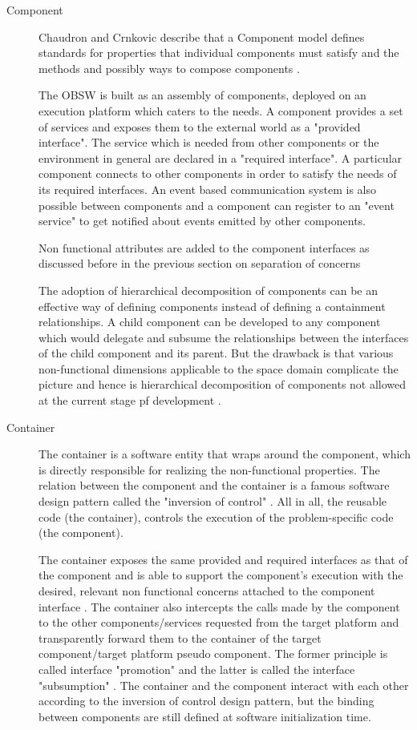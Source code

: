 \begin{description}
\item[Component] Chaudron and Crnkovic describe that a Component model defines standards for properties that individual components must satisfy and the methods and possibly ways to compose components \cite{CompBasedProcess}.

The OBSW is built as an assembly of components, deployed on an execution platform which caters to the needs. A component provides a set of services and exposes them to the external world as a "provided interface". The service which is needed from other components or the environment in general are declared in a "required interface". A particular component connects to other components in order to satisfy the needs of its required interfaces. An event based communication system is also possible between components and a component can register to an "event service" to get notified about events emitted by other components.

Non functional attributes are added to the component interfaces as discussed before in the previous section on separation of concerns

The adoption of hierarchical decomposition of components can be an effective way of defining components instead of defining a containment relationships. A child component can be developed to any component which would delegate and subsume the relationships between the interfaces of the child component and its parent. But the drawback is that various non-functional dimensions applicable to the space domain complicate the picture and hence is hierarchical decomposition of components not allowed at the current stage pf development \cite{PhdThesis}.
    
\item [Container] The container is a software entity that wraps around the component, which is directly responsible for realizing the non-functional properties. The relation between the component and the container is a famous software design pattern called the "inversion of control" \cite{CompBasedProcess} \cite{InvOfCntrlurl}. All in all, the reusable code (the container), controls the execution of the problem-specific code (the component).

The container exposes the same provided and required interfaces as that of the component and is able to support the component's execution with the desired, relevant non functional concerns attached to the component interface \cite{CompBasedDev}. The container also intercepts the calls made by the component to the other components/services requested from the target platform and transparently forward them to the container of the target component/target platform pseudo component. The former principle is called interface "promotion" and the latter is called the interface "subsumption" \cite{CompBasedDev}. The container and the component interact with each other according to the inversion of control design pattern, but the binding between components are still defined at software initialization time.


\end{description}
